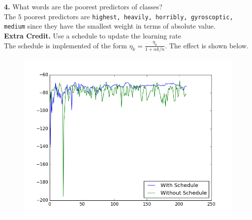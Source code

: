 \documentclass[12pt]{article}
\begin{document}
\textbf{4.} What words are the poorest predictors of classes?\\
The $5$ poorest predictors are \texttt{highest, heavily, horribly, gyroscoptic, medium} since they have the smallest weight in terms of absolute value.\\

\textbf{Extra Credit.} Use a schedule to update the learning rate\\

The schedule is implemented of the form $\eta_k=\frac{\eta_0}{1+\alpha k/n}$. The effect is shown below.
	\begin{figure}[H]
	\centering
	\includegraphics[scale = 0.35]{ec.png}
\end{figure}
\end{document}
